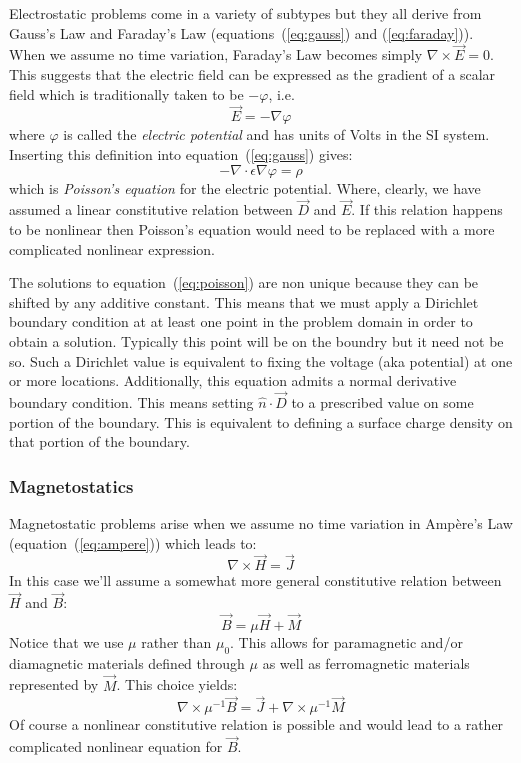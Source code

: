 \documentclass{article}
\newcommand{\refEq}[1]{(\ref{eq:#1})}
\newcommand{\Div}{\nabla\!\cdot\!}
\newcommand{\Curl}{\nabla\!\times\!}
\newcommand{\Grad}{\nabla\!}
\begin{document}
Electrostatic problems come in a variety of subtypes but they all
derive from Gauss's Law and Faraday's Law (equations~\refEq{gauss} and
\refEq{faraday}).  When we assume no time variation, Faraday's Law
becomes simply $\Curl\vec{E}=0$. This suggests that the electric field
can be expressed as the gradient of a scalar field which is
traditionally taken to be $-\varphi$, i.e.
\begin{equation}
\vec{E} = -\Grad\varphi \label{eq:gradphi}
\end{equation}
where $\varphi$ is called the {\em electric potential} and has units
of Volts in the SI system.  Inserting this definition into
equation~\refEq{gauss} gives:
\begin{equation}
-\Div\epsilon\Grad\varphi = \rho \label{eq:poisson}
\end{equation}
which is {\em Poisson's equation} for the electric potential.  Where,
clearly, we have assumed a linear constitutive relation between
$\vec{D}$ and $\vec{E}$.  If this relation happens to be nonlinear
then Poisson's equation would need to be replaced with a more
complicated nonlinear expression.

The solutions to equation~\refEq{poisson} are non unique because they
can be shifted by any additive constant.  This means that we must
apply a Dirichlet boundary condition at at least one point in the
problem domain in order to obtain a solution.  Typically this point
will be on the boundry but it need not be so.  Such a Dirichlet value
is equivalent to fixing the voltage (aka potential) at one or more
locations.  Additionally, this equation admits a normal derivative
boundary condition.  This means setting $\hat{n}\cdot\vec{D}$ to a
prescribed value on some portion of the boundary.  This is equivalent
to defining a surface charge density on that portion of the boundary.

\subsubsection{Magnetostatics}

Magnetostatic problems arise when we assume no time variation in
Amp\`ere's Law (equation~\refEq{ampere}) which leads to:
\[\Curl\vec{H}=\vec{J}\]
In this case we'll assume a somewhat more general constitutive
relation between $\vec{H}$ and $\vec{B}$:
\[\vec{B}=\mu\vec{H}+\vec{M}\]
Notice that we use $\mu$ rather than $\mu_0$.  This allows for
paramagnetic and/or diamagnetic materials defined through $\mu$ as
well as ferromagnetic materials represented by $\vec{M}$.  This choice
yields:
\[\Curl\mu^{-1}\vec{B}=\vec{J}+\Curl\mu^{-1}\vec{M}\]
Of course a nonlinear constitutive relation is possible and would lead
to a rather complicated nonlinear equation for $\vec{B}$.
\end{document}
